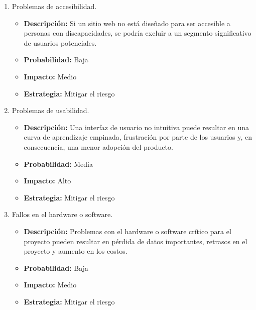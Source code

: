 \begin{enumerate}
    \item Problemas de accesibilidad.
    \begin{itemize}
        \item \textbf{Descripción:} Si un sitio web no está diseñado para ser accesible a personas con discapacidades, 
        se podría excluir a un segmento significativo de usuarios potenciales.
        \item \textbf{Probabilidad:} Baja
        \item \textbf{Impacto:} Medio
        \item \textbf{Estrategia:} Mitigar el riesgo
    \end{itemize}
    \item Problemas de usabilidad.
    \begin{itemize}
        \item \textbf{Descripción:} Una interfaz de usuario no intuitiva puede resultar en una curva de aprendizaje empinada, 
        frustración por parte de los usuarios y, en consecuencia, una menor adopción del producto.
        \item \textbf{Probabilidad:} Media
        \item \textbf{Impacto:} Alto
        \item \textbf{Estrategia:} Mitigar el riesgo
    \end{itemize}
    
    \item Fallos en el hardware o software.
    \begin{itemize}
        \item \textbf{Descripción:} Problemas con el hardware o software crítico para el proyecto pueden resultar en pérdida de datos importantes, retrasos en el proyecto y aumento en los costos.
        \item \textbf{Probabilidad:} Baja
        \item \textbf{Impacto:} Medio
        \item \textbf{Estrategia:} Mitigar el riesgo
    \end{itemize}
  
    
\end{enumerate}


